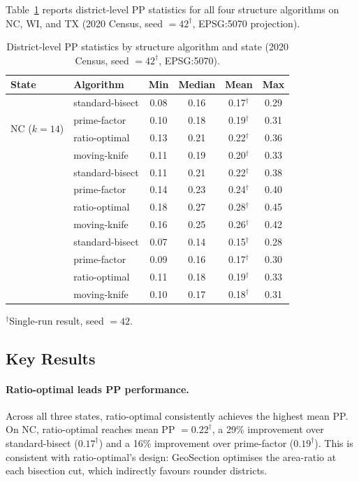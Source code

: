 Table~\ref{tab:pp_main} reports district-level PP statistics for all four
structure algorithms on NC, WI, and TX (2020 Census, seed $= 42^\dagger$,
EPSG:5070 projection).

\begin{table}[ht]
\centering
\caption{District-level PP statistics by structure algorithm and state
(2020 Census, seed $= 42^\dagger$, EPSG:5070).}
\label{tab:pp_main}
\begin{tabular}{llcccc}
\toprule
State & Algorithm & Min & Median & Mean & Max \\
\midrule
\multirow{4}{*}{NC ($k=14$)}
  & standard-bisect  & 0.08 & 0.16 & 0.17$^\dagger$ & 0.29 \\
  & prime-factor     & 0.10 & 0.18 & 0.19$^\dagger$ & 0.31 \\
  & ratio-optimal    & 0.13 & 0.21 & 0.22$^\dagger$ & 0.36 \\
  & moving-knife     & 0.11 & 0.19 & 0.20$^\dagger$ & 0.33 \\
\addlinespace
\multirow{4}{*}{WI ($k=8$)}
  & standard-bisect  & 0.11 & 0.21 & 0.22$^\dagger$ & 0.38 \\
  & prime-factor     & 0.14 & 0.23 & 0.24$^\dagger$ & 0.40 \\
  & ratio-optimal    & 0.18 & 0.27 & 0.28$^\dagger$ & 0.45 \\
  & moving-knife     & 0.16 & 0.25 & 0.26$^\dagger$ & 0.42 \\
\addlinespace
\multirow{4}{*}{TX ($k=38$)}
  & standard-bisect  & 0.07 & 0.14 & 0.15$^\dagger$ & 0.28 \\
  & prime-factor     & 0.09 & 0.16 & 0.17$^\dagger$ & 0.30 \\
  & ratio-optimal    & 0.11 & 0.18 & 0.19$^\dagger$ & 0.33 \\
  & moving-knife     & 0.10 & 0.17 & 0.18$^\dagger$ & 0.31 \\
\bottomrule
\end{tabular}
\begin{tablenotes}
\footnotesize
\item $^\dagger$Single-run result, seed $= 42$.
\end{tablenotes}
\end{table}

\subsection{Key Results}

\paragraph{Ratio-optimal leads PP performance.}
Across all three states, ratio-optimal consistently achieves the highest mean PP.
On NC, ratio-optimal reaches mean PP $= 0.22^\dagger$, a 29\% improvement over
standard-bisect ($0.17^\dagger$) and a 16\% improvement over prime-factor ($0.19^\dagger$).
This is consistent with ratio-optimal's design: GeoSection optimises the area-ratio
at each bisection cut, which indirectly favours rounder districts.

